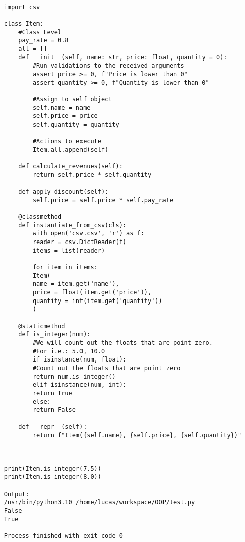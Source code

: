 \documentclass{article}
\begin{document}
\begin{lstlisting}
	
	import csv
	
	class Item:
		#Class Level
		pay_rate = 0.8
		all = []
		def __init__(self, name: str, price: float, quantity = 0):
			#Run validations to the received arguments
			assert price >= 0, f"Price is lower than 0"
			assert quantity >= 0, f"Quantity is lower than 0"
			
			#Assign to self object
			self.name = name
			self.price = price
			self.quantity = quantity
			
			#Actions to execute
			Item.all.append(self)
		
		def calculate_revenues(self):
			return self.price * self.quantity
			
		def apply_discount(self):
			self.price = self.price * self.pay_rate
			
		@classmethod
		def instantiate_from_csv(cls):
			with open('csv.csv', 'r') as f:
			reader = csv.DictReader(f)
			items = list(reader)
			
			for item in items:
			Item(
			name = item.get('name'),
			price = float(item.get('price')),
			quantity = int(item.get('quantity'))
			)

		@staticmethod
		def is_integer(num):
			#We will count out the floats that are point zero.
			#For i.e.: 5.0, 10.0
			if isinstance(num, float):
			#Count out the floats that are point zero
			return num.is_integer()
			elif isinstance(num, int):
			return True
			else:
			return False
			
		def __repr__(self):
			return f"Item({self.name}, {self.price}, {self.quantity})"
			
		
	
	print(Item.is_integer(7.5))
	print(Item.is_integer(8.0))
	
	Output:
	/usr/bin/python3.10 /home/lucas/workspace/OOP/test.py 
	False
	True
	
	Process finished with exit code 0
	
\end{lstlisting}
\end{document}
